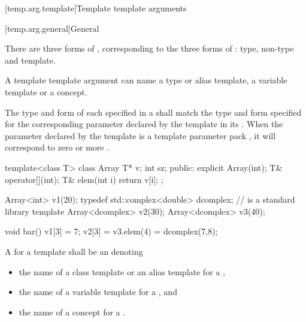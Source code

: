 \documentclass{wg21}
\begin{document}
[temp.arg.template]{Template template arguments}

[temp.arg.general]{General}

\pnum
{}%
There are three forms of
,
corresponding to the three forms of
:
type, non-type and template.
\begin{addedblock}
A template template argument can name a type or alias template, a variable template or a concept.
\end{addedblock}

The type and form of each
specified in a
shall match the type and form specified for the corresponding
parameter declared by the template in its
.
When the parameter declared by the template is a template
parameter pack , it will correspond to zero or more
.
\begin{example}
\begin{codeblock}
    template<class T> class Array {
        T* v;
        int sz;
        public:
        explicit Array(int);
        T& operator[](int);
        T& elem(int i) { return v[i]; }
    };

    Array<int> v1(20);
    typedef std::complex<double> dcomplex;  //  is a standard library template
    Array<dcomplex> v2(30);
    Array<dcomplex> v3(40);

    void bar() {
        v1[3] = 7;
        v2[3] = v3.elem(4) = dcomplex(7,8);
    }
\end{codeblock}
\end{example}

\pnum
{}

\begin{addedblock}
A  for a template  shall be an  denoting
\begin{itemize}
\item the name of a class template or an alias template for a ,
\item the name of a variable template for a , and
\item the name of a concept for a .
\end{itemize}
\end{addedblock}
\end{document}
